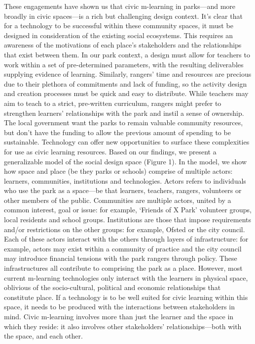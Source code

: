 These engagements have shown us that civic m-learning in parks—and more broadly in civic spaces—is a rich but challenging design context. It’s clear that for a technology to be successful within these community spaces, it must be designed in consideration of the existing social ecosystems. This requires an awareness of the motivations of each place’s stakeholders and the relationships that exist between them. In our park context, a design must allow for teachers to work within a set of pre-determined parameters, with the resulting deliverables supplying evidence of learning. Similarly, rangers’ time and resources are precious due to their plethora of commitments and lack of funding, so the activity design and creation processes must be quick and easy to distribute. While teachers may aim to teach to a strict, pre-written curriculum, rangers might prefer to strengthen learners’ relationships with the park and instil a sense of ownership. The local government want the parks to remain valuable community resources, but don’t have the funding to allow the previous amount of spending to be sustainable. Technology can offer new opportunities to surface these complexities for use as civic learning resources.
Based on our findings, we present a generalizable model of the social design
space (Figure 1). In the model, we show how space and place (be they parks or
schools) comprise of multiple actors: learners, communities, institutions and
technologies. Actors refers to individuals who use the park as a space—be that
learners, teachers, rangers, volunteers or other members of the public.
Communities are multiple actors, united by a common interest, goal or issue: for
example, ‘Friends of X Park’ volunteer groups, local residents and school
groups. Institutions are those that impose requirements and/or restrictions on
the other groups: for example, Ofsted or the city council. Each of these actors
interact with the others through layers of infrastructure: for example, actors
may exist within a community of practice and the city council may introduce
financial tensions with the park rangers through policy. These infrastructures
all contribute to comprising the park as a place.
However, most current m-learning technologies only interact with the learners in physical space, oblivious of the socio-cultural, political and economic relationships that constitute place. If a technology is to be well suited for civic learning within this space, it needs to be produced with the interactions between stakeholders in mind. Civic m-learning involves more than just the learner and the space in which they reside: it also involves other stakeholders’ relationships—both with the space, and each other.

